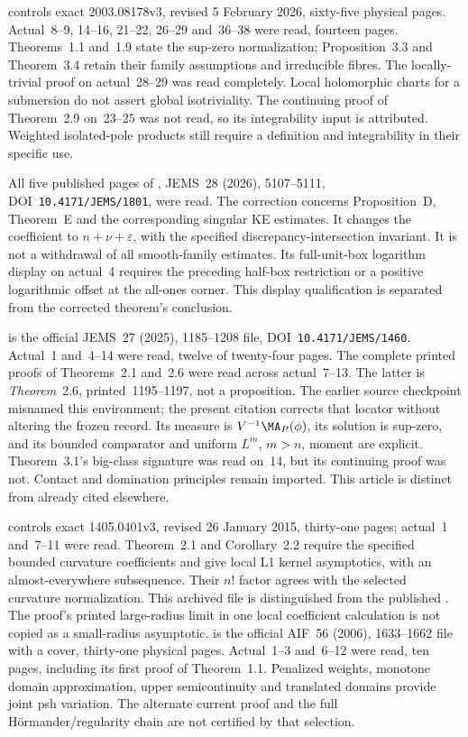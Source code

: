\cite{DGG26FamiliesCorrectedV3} controls exact
2003.08178v3, revised 5 February 2026, sixty-five physical pages.
Actual~8--9, 14--16, 21--22, 26--29 and~36--38 were read,
fourteen pages. Theorems~1.1 and~1.9 state the sup-zero
normalization; Proposition~3.3 and Theorem~3.4 retain their family
assumptions and irreducible fibres. The locally-trivial proof on
actual~28--29 was read completely. Local holomorphic charts for
a submersion do not assert global isotriviality. The continuing
proof of Theorem~2.9 on~23--25 was not read, so its integrability
input is attributed. Weighted isolated-pole products still require
a definition and integrability in their specific use.

All five published pages of \cite{DGG26CorrigendumPublished},
JEMS~28 (2026), 5107--5111, DOI~\nolinkurl{10.4171/JEMS/1801}, were read.
The correction concerns Proposition~D, Theorem~E and the corresponding
singular KE estimates. It changes the coefficient to
$n+\nu+\varepsilon$, with the specified discrepancy-intersection
invariant. It is not a withdrawal of all smooth-family estimates.
Its full-unit-box logarithm display on actual~4 requires the
preceding half-box restriction or a positive logarithmic offset
at the all-ones corner. This display qualification is separated
from the corrected theorem's conclusion.

\cite{GuedjLu25EnvelopeEstimatesPublished} is the official
JEMS~27 (2025), 1185--1208 file, DOI~\nolinkurl{10.4171/JEMS/1460}.
Actual~1 and~4--14 were read, twelve of twenty-four pages.
The complete printed proofs of Theorems~2.1 and~2.6 were read
across actual~7--13. The latter is \emph{Theorem}~2.6,
printed~1195--1197, not a proposition. The earlier source
checkpoint misnamed this environment; the present citation
corrects that locator without altering the frozen record.
Its measure is $V^{-1}\MA_P(\phi)$, its solution is sup-zero,
and its bounded comparator and uniform $L^m$, $m>n$, moment
are explicit. Theorem~3.1's big-class signature was read on~14,
but its continuing proof was not. Contact and domination
principles remain imported. This article is distinct from
\cite{GuedjLu25FromYauV2} already cited elsewhere.

\cite{BermanBerndtsson15KernelV3} controls exact
1405.0401v3, revised 26 January 2015, thirty-one pages;
actual~1 and~7--11 were read. Theorem~2.1 and Corollary~2.2
require the specified bounded curvature coefficients and give
local L1 kernel asymptotics, with an almost-everywhere subsequence.
Their $n!$ factor agrees with the selected curvature normalization.
This archived file is distinguished from the published \cite{BB17}.
The proof's printed large-radius limit in one local coefficient
calculation is not copied as a small-radius asymptotic.
\cite{Berndtsson06KernelPublished} is the official AIF~56
(2006), 1633--1662 file with a cover, thirty-one physical pages.
Actual~1--3 and~6--12 were read, ten pages, including its
first proof of Theorem~1.1. Penalized weights, monotone domain
approximation, upper semicontinuity and translated domains provide
joint psh variation. The alternate current proof and the full
H\"ormander/regularity chain are not certified by that selection.

